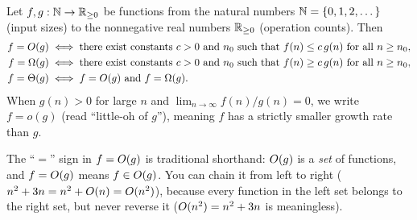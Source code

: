 \begin{definition}
\label{ch42:def-bigo}
Let $f, g : \mathbb{N} \to \mathbb{R}_{\ge 0}$ be functions from the natural numbers $\mathbb{N} = \{0,1,2,\dots\}$ (input sizes) to the nonnegative real numbers $\mathbb{R}_{\ge 0}$ (operation counts). Then
\begin{align*}
f = O(g) &\iff \text{there exist constants } c > 0 \text{ and } n_0 \text{ such that } f(n) \le c\,g(n) \text{ for all } n \ge n_0, \\
f = \Omega(g) &\iff \text{there exist constants } c > 0 \text{ and } n_0 \text{ such that } f(n) \ge c\,g(n) \text{ for all } n \ge n_0, \\
f = \Theta(g) &\iff f = O(g) \text{ and } f = \Omega(g).
\end{align*}
When $g(n) > 0$ for large $n$ and $\lim_{n\to\infty} f(n)/g(n) = 0$, we write $f = o(g)$ (read ``little-oh of $g$''), meaning $f$ has a strictly smaller growth rate than $g$.
\end{definition}

The ``$=$'' sign in $f = O(g)$ is traditional shorthand: $O(g)$ is a \emph{set} of functions, and $f = O(g)$ means $f \in O(g)$. You can chain it from left to right ($n^2 + 3n = n^2 + O(n) = O(n^2)$), because every function in the left set belongs to the right set, but never reverse it ($O(n^2) = n^2 + 3n$ is meaningless).

